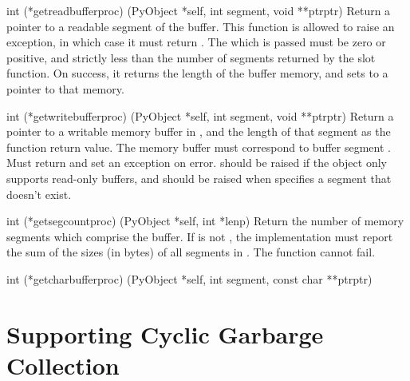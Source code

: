 \documentclass{manual}
\begin{document}
\begin{ctypedesc}[getreadbufferproc]{int (*getreadbufferproc)
                            (PyObject *self, int segment, void **ptrptr)}
Return a pointer to a readable segment of the buffer.  This function
is allowed to raise an exception, in which case it must return
.  The  which is passed must be zero or
positive, and strictly less than the number of segments returned by
the  slot function.  On success, it returns the
length of the buffer memory, and sets  to a
pointer to that memory.
\end{ctypedesc}

\begin{ctypedesc}[getwritebufferproc]{int (*getwritebufferproc)
                            (PyObject *self, int segment, void **ptrptr)}
Return a pointer to a writable memory buffer in ,
and the length of that segment as the function return value.
The memory buffer must correspond to buffer segment .
Must return  and set an exception on error.
 should be raised if the object only supports
read-only buffers, and  should be raised when
 specifies a segment that doesn't exist.
\end{ctypedesc}

\begin{ctypedesc}[getsegcountproc]{int (*getsegcountproc)
                            (PyObject *self, int *lenp)}
Return the number of memory segments which comprise the buffer.  If
 is not \NULL, the implementation must report the sum of the 
sizes (in bytes) of all segments in .
The function cannot fail.
\end{ctypedesc}

\begin{ctypedesc}[getcharbufferproc]{int (*getcharbufferproc)
                            (PyObject *self, int segment, const char **ptrptr)}
\end{ctypedesc}


\section{Supporting Cyclic Garbarge Collection
         \label{supporting-cycle-detection}}
\end{document}
